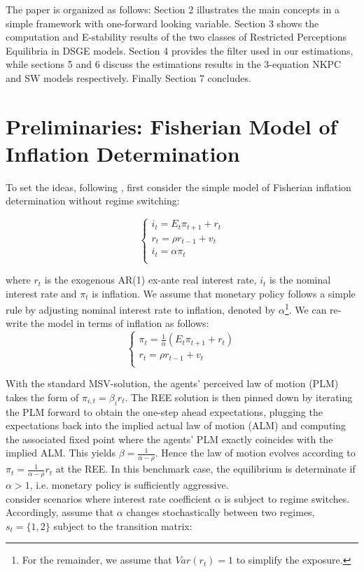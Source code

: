 \documentclass[12pt,reqno]{article}
\numberwithin{equation}{section}
\begin{document}
\noindent
The paper is organized as follows: Section 2 illustrates the main concepts in a simple framework with one-forward looking variable. Section 3 shows the  computation and E-stability results of the two classes of Restricted Perceptions Equilibria in DSGE models. Section 4 provides the filter used in our estimations, while sections 5 and 6 discuss the estimations results in the 3-equation NKPC and SW models respectively. Finally Section 7 concludes.   


\section{Preliminaries: Fisherian Model of Inflation Determination}



To set the ideas, following \cite{davig2007generalizing}, first consider the simple model of Fisherian inflation determination without regime switching: 


$$
\begin{cases}
i_t = E_t \pi_{t+1} + r_t \\
r_t = \rho r_{t-1} + v_t \\
i_t = \alpha\pi_t \\
\end{cases}
$$

where $ r_t $ is the exogenous AR(1) ex-ante real interest rate, $ i_t $ is the nominal interest rate and $\pi_t $ is inflation. We assume that monetary policy follows a simple rule by adjusting nominal interest rate to inflation, denoted by $\alpha$\footnote{For the remainder, we assume that $Var(r_t)=1$ to simplify the exposure.}. We can re-write the model in terms of inflation as follows: \\

$$
\begin{cases}
\pi_t = \frac{1}{\alpha}(E_t \pi_{t+1} + r_t) \\
r_t = \rho r_{t-1} + v_t \\
\end{cases}
$$

With the standard MSV-solution, the agents’ perceived law of motion (PLM) takes the form of $ \pi_{i,t} = \beta_i r_t $. The REE solution is then pinned down by iterating the PLM forward to obtain the one-step ahead expectations, plugging the expectations back into the implied actual law of motion (ALM) and computing the associated fixed point where the agents’ PLM exactly coincides with the implied ALM. This yields $\beta= \frac{1}{\alpha-\rho}$. Hence the law of motion evolves according to $\pi_t= \frac{1}{\alpha-\rho} r_t $ at the REE. In this benchmark case, the equilibrium is determinate if $\alpha>1 $, i.e. monetary policy is sufficiently aggressive.\\
\cite{davig2007generalizing} consider scenarios where interest rate coefficient $\alpha$ is subject to regime switches. Accordingly, assume that $\alpha$ changes stochastically between two regimes, $s_t = \{1,2 \} $ subject to the transition matrix:
\end{document}
